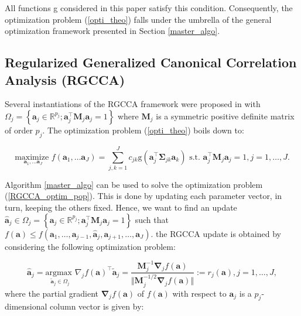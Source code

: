 \documentclass[
]{jss}
\begin{document}
All functions g considered in this paper satisfy this condition.
Consequently, the optimization problem (\ref{opti_theo}) falls under the
umbrella of the general optimization framework presented in Section
\ref{master_algo}.

\hypertarget{regularized-generalized-canonical-correlation-analysis-rgcca}{%
\subsection{Regularized Generalized Canonical Correlation Analysis
(RGCCA)}\label{regularized-generalized-canonical-correlation-analysis-rgcca}}

Several instantiations of the RGCCA framework were proposed in
\cite{Tenenhaus2011, 
Tenenhaus2015, Tenenhaus2017} with
\(\Omega_j=\left\lbrace \mathbf a_j \in \mathbb{R}^{p_j}; \mathbf{a}_j^\top \mathbf M_j \mathbf{a}_j = 1 \right\rbrace\)
where \(\mathbf{M}_j\) is a symmetric positive definite matrix of order
\(p_j\). The optimization problem (\ref{opti_theo}) boils down to:

\begin{equation}
\underset{ \mathbf a_1, \ldots  \mathbf a_J}{\text{maximize }} f( \mathbf a_1, \ldots  \mathbf a_J) = \sum_{j,k=1}^J c_{jk} \text{g}\left( \mathbf a_j^\top  \mathbf \Sigma_{jk} \mathbf{a}_k \right) \text{ s.t. }  \mathbf a_j^\top \mathbf M_j  \mathbf a_j = 1,  j=1, \ldots, J.
\label{RGCCA_optim_pop}
\end{equation}

Algorithm \ref{master_algo} can be used to solve the optimization
problem (\ref{RGCCA_optim_pop}). This is done by updating each parameter
vector, in turn, keeping the others fixed. Hence, we want to find an
update
\(\hat{\mathbf{a}}_j\in \Omega_j=\left\lbrace \mathbf a_j \in \mathbb{R}^{p_j}; \mathbf{a}_j^\top \mathbf M_j \mathbf{a}_j = 1 \right\rbrace\)
such that
\(f(\mathbf{a})\leq f(\mathbf{a}_1, \ldots, \mathbf{a}_{j-1}, \hat{\mathbf{a}}_j, \mathbf{a}_{j+1}, \ldots, \mathbf{a}_J)\).
the RGCCA update is obtained by considering the following optimization
problem:

\begin{equation}
\hat{\mathbf{a}}_j = \underset{\tilde{\mathbf{a}}_j\in\Omega_j}{\text{argmax }}  \nabla_j f(\mathbf{a})^\top \tilde{\mathbf{a}}_j = \frac{ \mathbf M_j^{-1} \mathbf \nabla_j f( \mathbf a)}{\Vert  \mathbf M_j^{-1/2} \mathbf \nabla_j f( \mathbf a) \Vert} := r_j( \mathbf a) , j=1, \ldots, J,
\label{RGCCA_update}
\end{equation} where the partial gradient
\(\mathbf \nabla_j f( \mathbf a)\) of \(f( \mathbf a)\) with respect to
\(\mathbf a_j\) is a \(p_j\)-dimensional column vector is given by:
\end{document}
